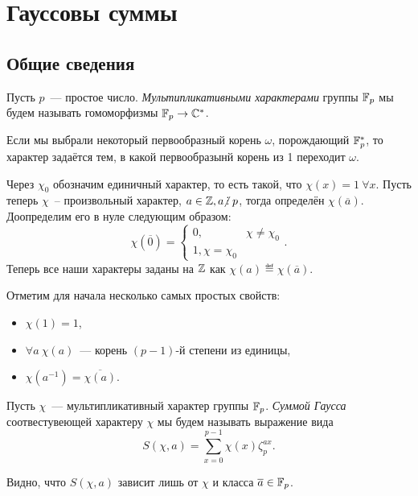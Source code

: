 	
	\section{Гауссовы суммы}

	\subsection{Общие сведения}

	\begin{definition} 
		Пусть $p$~--- простое число. \emph{Мультипликативными характерами} группы $\mathbb{F}_p$ мы будем называть гомоморфизмы $\mathbb{F}_{p} \to \mathbb{C}^*$. 
	\end{definition}

	Если мы выбрали некоторый первообразный корень $\omega$, порождающий $\mathbb{F}_p^*$, то характер задаётся тем, в какой первообразынй корень из 1 переходит $\omega$. 

	Через $\chi_0$ обозначим единичный характер, то есть такой, что $\chi(x) = 1 \ \forall x$. Пусть теперь $\chi$~-- произвольный характер,  $a \in \Z, a \notdivby p$, тогда определён $\chi(\overline{a})$. Доопределим его в нуле следующим образом: 
	\[
		\chi(\overline{0}) = \begin{cases} 0, & \chi \neq \chi_0 \\ 1, \chi = \chi_0 \end{cases}. 
	\]
	Теперь все наши характеры заданы на $\mathbb{Z}$ как $\chi(a) \eqdef \chi(\overline{a})$.

	Отметим для начала несколько самых простых свойств: 

	\begin{itemize}
		\item $\chi(1) = 1$,
		\item $\forall a \ \chi(a)$~--- корень $(p - 1)$-й степени из единицы, 
		\item $\chi(a^{-1}) = \overline{\chi(a)}$.
	\end{itemize}


	\begin{definition} 
		Пусть $\chi$~--- мультипликативный характер группы $\mathbb{F}_p$. \emph{Суммой Гаусса} соотвестувеющей характеру $\chi$ мы будем называть выражение вида 
		\[
			S(\chi, a) = \sum_{x = 0}^{p - 1} \chi(x) \zeta_p^{ax}. 
		\]
	\end{definition}

	\begin{remark}
		Видно, ччто $S(\chi, a)$ зависит лишь от $\chi$ и класса $\overline{a} \in \mathbb{F}_p$. 
	\end{remark}

